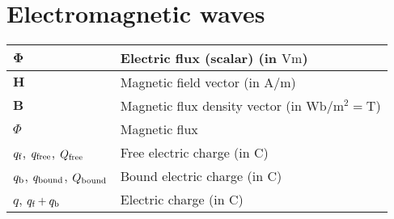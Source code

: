 \section{Electromagnetic waves}
\begin{xltabular}{\textwidth}{XX}
	\(\mathbf{\Phi}\)                                                                                                               & Electric flux (scalar) (in \(\si{\volt\meter}\))                                                                                                                                         \\ \hline
	\(\mathbf{H}\)                                                                                                                  & Magnetic field vector (in \(\si{\ampere\per\meter}\))                                                                                                                                    \\ \hline
	\(\mathbf{B}\)                                                                                                                  & Magnetic flux density vector (in \(\si{\weber\per\meter\squared} = \si{\tesla}\))                                                                                                        \\ \hline
	\(\Phi\)\cite{chengFieldWaveElectromagnetics1989}                                                                               & Magnetic flux                                                                                                                                                                            \\ \hline
	\(q_{\textnormal{f}}\), \(q_{\textnormal{free}}\), \(Q_{\textnormal{free}}\)\cite{wiki:D-field-flux}                            & Free electric charge (in \(\si{\coulomb}\))                                                                                                                                              \\ \hline
	\(q_{\textnormal{b}}\), \(q_{\textnormal{bound}}\), \(Q_{\textnormal{bound}}\)\cite{wiki:D-field-flux}                          & Bound electric charge (in \(\si{\coulomb}\))                                                                                                                                             \\ \hline
	\(q\), \(q_{\textnormal{f}}+q_{\textnormal{b}}\)                                                                                & Electric charge (in \(\si{\coulomb}\))                                                                                                                                                   \\ \hline

\end{xltabular}
